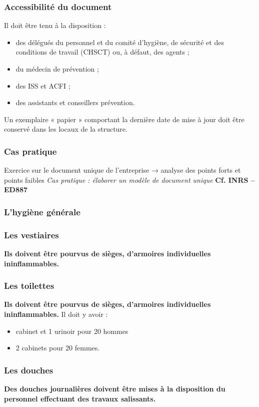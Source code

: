 \documentclass{beamer}
\begin{document}
\begin{frame}
\frametitle{Accessibilité du document}
Il doit être tenu à la disposition :
\begin{itemize}
\item des délégués du personnel et du comité d’hygiène, de sécurité et des conditions de travail (CHSCT) ou, à défaut, des agents ;
\item du médecin de prévention ;
\item des ISS et ACFI ;
\item des assistants et conseillers prévention.
\end{itemize}
Un exemplaire « papier » comportant la dernière date de mise à jour doit être conservé dans les locaux de la structure.
\end{frame}

\begin{frame}
\frametitle{Cas pratique}
Exercice sur le document unique de l’entreprise → analyse des points forts et points faibles
\textit{Cas pratique : élaborer un modèle de document unique} 
\textbf{Cf. INRS – ED887}
\end{frame}

\begin{frame}
\frametitle{L’hygiène générale}
\end{frame}

\begin{frame}
\frametitle{Les vestiaires}
\textbf{Ils doivent être pourvus de sièges, d’armoires individuelles ininflammables.}
\end{frame}

\begin{frame}
\frametitle{Les toilettes}
\textbf{Ils doivent être pourvus de sièges, d’armoires individuelles ininflammables.}
Il doit y avoir :
\begin{itemize}
\item cabinet et 1 urinoir pour 20 hommes 
\item 2 cabinets pour 20 femmes.
\end{itemize}
\end{frame}

\begin{frame}
\frametitle{Les douches}
\textbf{Des  douches journalières doivent être mises à la disposition du personnel effectuant des travaux salissants.}
\end{frame}
\end{document}
